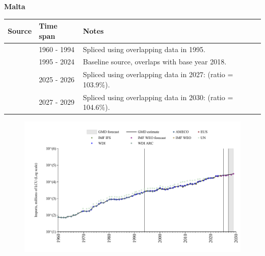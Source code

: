 \documentclass[12pt,a4paper,landscape]{article}
\begin{document}
\begin{adjustbox}{max totalsize={\paperwidth}{\paperheight},center}
\begin{minipage}[t][\textheight][t]{\textwidth}
\vspace*{0.5cm}
{}
\begin{center}
{\Large\bfseries Malta}
\end{center}
\vspace{0.5cm}
\begin{table}[H]
\centering
\small
\begin{tabular}{|l|l|l|}
\hline
\textbf{Source} & \textbf{Time span} & \textbf{Notes} \\
\hline
\rowcolor{white}\cite{AMECO}& 1960 - 1994 &Spliced using overlapping data in 1995.\\
\rowcolor{lightgray}\cite{EUS}& 1995 - 2024 &Baseline source, overlaps with base year 2018.\\
\rowcolor{white}\cite{AMECO}& 2025 - 2026 &Spliced using overlapping data in 2027: (ratio = 103.9\%).\\
\rowcolor{lightgray}\cite{IMF_WEO_forecast}& 2027 - 2029 &Spliced using overlapping data in 2030: (ratio = 104.6\%).\\
\hline
\end{tabular}
\end{table}
\begin{figure}[H]
\centering
\includegraphics[width=\textwidth,height=0.6\textheight,keepaspectratio]{graphs/MLT_imports.pdf}
\end{figure}
\end{minipage}
\end{adjustbox}
\end{document}
